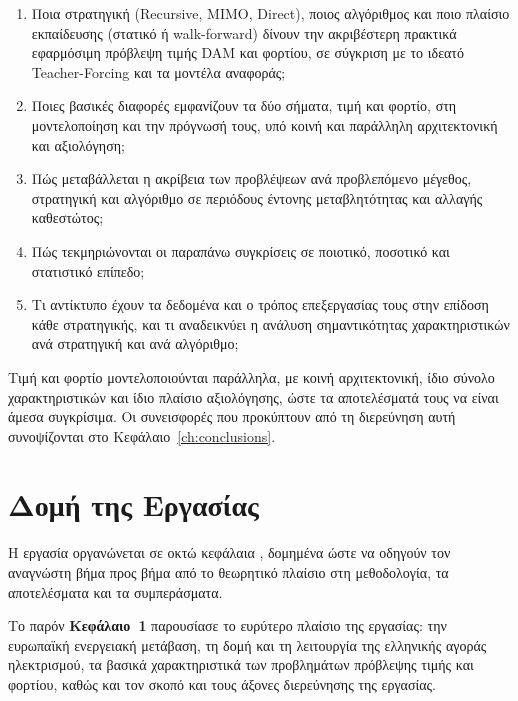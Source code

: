\begin{enumerate}[label=\textbf{ΕΕ\arabic*.}, leftmargin=2.2em, itemsep=4pt]
  \item Ποια στρατηγική (Recursive, MIMO, Direct), ποιος αλγόριθμος
        και ποιο πλαίσιο εκπαίδευσης (στατικό ή walk-forward) δίνουν την ακριβέστερη
         πρακτικά εφαρμόσιμη πρόβλεψη τιμής DAM και φορτίου, σε σύγκριση με το
        ιδεατό Teacher-Forcing και τα μοντέλα αναφοράς;
  \item Ποιες βασικές διαφορές εμφανίζουν τα δύο σήματα, τιμή και φορτίο, στη
        μοντελοποίηση και την πρόγνωσή τους, υπό κοινή και παράλληλη αρχιτεκτονική
        και αξιολόγηση;
  \item Πώς μεταβάλλεται η ακρίβεια των προβλέψεων ανά προβλεπόμενο μέγεθος, στρατηγική και αλγόριθμο σε περιόδους έντονης μεταβλητότητας και αλλαγής καθεστώτος;
  \item Πώς τεκμηριώνονται οι παραπάνω συγκρίσεις σε ποιοτικό, ποσοτικό και στατιστικό επίπεδο;
    
  \item Τι αντίκτυπο έχουν τα δεδομένα και ο τρόπος επεξεργασίας τους στην επίδοση
        κάθε στρατηγικής, και τι αναδεικνύει η ανάλυση σημαντικότητας χαρακτηριστικών
        ανά στρατηγική και ανά αλγόριθμο;
\end{enumerate}

Τιμή και φορτίο μοντελοποιούνται παράλληλα, με κοινή αρχιτεκτονική, ίδιο σύνολο
χαρακτηριστικών και ίδιο πλαίσιο αξιολόγησης, ώστε τα αποτελέσματά τους να είναι άμεσα
συγκρίσιμα. Οι συνεισφορές που προκύπτουν από τη διερεύνηση αυτή συνοψίζονται στο
Κεφάλαιο~\ref{ch:conclusions}.



\section{Δομή της Εργασίας}
\label{sec:structure}

Η εργασία οργανώνεται σε οκτώ κεφάλαια , δομημένα ώστε να
οδηγούν τον αναγνώστη βήμα προς βήμα από το θεωρητικό πλαίσιο στη μεθοδολογία, τα
αποτελέσματα και τα συμπεράσματα.

Το παρόν \textbf{Κεφάλαιο~1} παρουσίασε το ευρύτερο πλαίσιο της εργασίας: την ευρωπαϊκή
ενεργειακή μετάβαση, τη δομή και τη λειτουργία της ελληνικής αγοράς ηλεκτρισμού, τα
βασικά χαρακτηριστικά των προβλημάτων πρόβλεψης τιμής και φορτίου, καθώς και τον
σκοπό και τους άξονες διερεύνησης της εργασίας.


